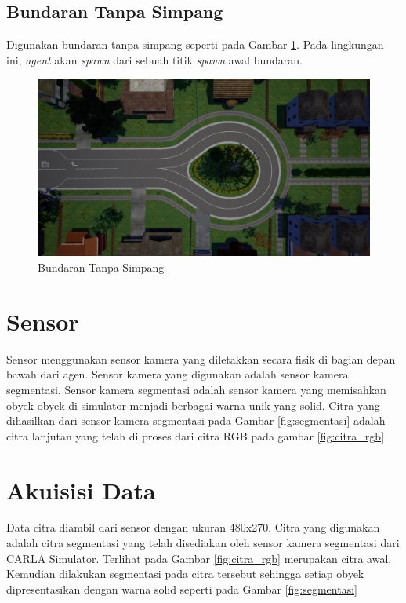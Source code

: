 \subsection{Bundaran Tanpa Simpang}
Digunakan bundaran tanpa simpang seperti pada Gambar  \ref{fig:bundaran_tanpa_simpang}. Pada lingkungan ini, \textit{agent} akan \textit{spawn }dari sebuah titik \textit{spawn} awal bundaran.
\begin{figure}[H] 
	\centering
	\includegraphics[width=.7\linewidth]{images/bundaran_tanpa_simpang}
	\caption{Bundaran Tanpa Simpang}
	\label{fig:bundaran_tanpa_simpang}
\end{figure}

\section{Sensor}
\label{sec:sensor}
Sensor menggunakan sensor kamera yang diletakkan secara fisik di bagian depan bawah dari agen. Sensor kamera yang digunakan adalah sensor kamera segmentasi. Sensor kamera segmentasi adalah sensor kamera yang memisahkan obyek-obyek di simulator menjadi berbagai warna unik yang solid. Citra yang dihasilkan dari sensor kamera segmentasi pada Gambar \ref{fig:segmentasi} adalah citra lanjutan yang telah di proses dari citra RGB pada gambar \ref{fig:citra_rgb}


\section{Akuisisi Data}
\label{sec:akuisisi_data}
Data citra diambil dari sensor dengan ukuran 480x270. Citra yang digunakan adalah citra segmentasi yang telah disediakan oleh sensor kamera segmentasi dari CARLA Simulator. Terlihat pada Gambar \ref{fig:citra_rgb} merupakan citra awal. Kemudian dilakukan segmentasi pada citra tersebut sehingga setiap obyek dipresentasikan dengan warna solid seperti pada Gambar \ref{fig:segmentasi}

